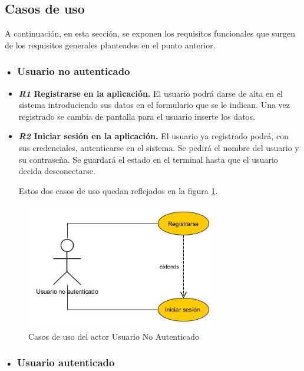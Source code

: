 \subsection{Casos de uso}
A continuación, en esta sección, se exponen los requisitos funcionales que surgen de los requisitos generales planteados en el punto anterior.
\subsubsection{• Usuario no autenticado}
\begin{itemize}
\item\textbf{ \textit{R1}  Registrarse en la aplicación.}
 El usuario podrá darse de alta en el sistema
introduciendo sus datos en el formulario que se le indican. Una vez registrado se cambia de pantalla para el usuario inserte los datos.

\item \textbf{\textit{R2} Iniciar sesión en la aplicación. }
El usuario ya registrado podrá, con
sus credenciales, autenticarse en el  sistema. Se pedirá el nombre del usuario y su contraseña. Se guardará el estado en el terminal hasta que el usuario decida desconectarse.

Estos dos casos de uso quedan reflejados en la figura \ref{fig:usuario-no-autenticado}.


\end{itemize} 
\begin{figure}
		\centering
		\includegraphics[width=0.75\textwidth] {usuario-no-autenticado.jpg}
		\caption{Casos de uso del actor Usuario No Autenticado }\label{fig:usuario-no-autenticado}
	\end{figure}
	
	
	
\subsubsection{• Usuario  autenticado}


